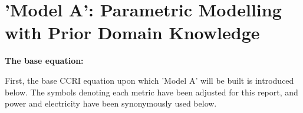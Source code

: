     
    

\section{'Model A': Parametric Modelling with Prior Domain Knowledge}



\textbf{The base equation:}

First, the base CCRI equation \cite{CryptoCarbonRatingsInstitute2022TheNetwork} upon which 'Model A' will be built is introduced below. The symbols denoting each metric have been adjusted for this report, and power and electricity have been synonymously used below. 

